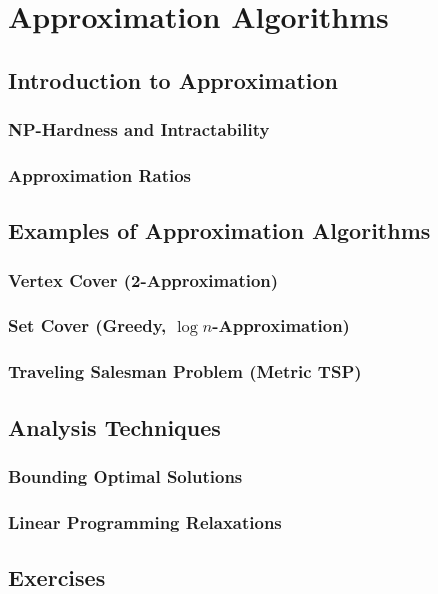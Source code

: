 
\chapter{Approximation Algorithms}
\section{Introduction to Approximation}
\subsection{NP-Hardness and Intractability}
\subsection{Approximation Ratios}

\section{Examples of Approximation Algorithms}
\subsection{Vertex Cover (2-Approximation)}
\subsection{Set Cover (Greedy, $\log n$-Approximation)}
\subsection{Traveling Salesman Problem (Metric TSP)}

\section{Analysis Techniques}
\subsection{Bounding Optimal Solutions}
\subsection{Linear Programming Relaxations}

\section{Exercises}
